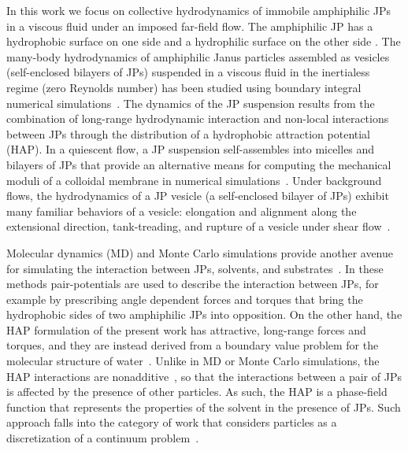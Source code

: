 \documentclass[prb,preprint,showpacs,preprintnumbers,amsmath,amssymb,longbibliography]{revtex4-2}
\begin{document}
In this work we focus on collective hydrodynamics of immobile
amphiphilic JPs in a viscous fluid under an imposed far-field flow. The
amphiphilic JP has a hydrophobic surface on one side and a hydrophilic
surface on the other side \cite{doi:10.1021/la503455h}. The many-body
hydrodynamics of amphiphilic Janus particles assembled as vesicles
(self-enclosed bilayers of JPs) suspended in a viscous fluid in the
inertialess regime (zero Reynolds number) has been studied using
boundary integral numerical simulations~\cite{Fu20,Fu2022_JFM}. The
dynamics of the JP suspension results from the combination of long-range
hydrodynamic interaction and non-local interactions between JPs through
the distribution of a hydrophobic attraction potential (HAP).
%
In a quiescent flow, a JP suspension self-assembles into micelles and
bilayers of JPs that provide an alternative means for computing the
mechanical moduli of a colloidal membrane in numerical
simulations~\cite{NaTr00, Fu20, KrFiGuKaHa13}. Under background flows,
the hydrodynamics of a JP vesicle (a self-enclosed bilayer of JPs)
exhibit many familiar behaviors of a vesicle: elongation and alignment
along the extensional direction, tank-treading, and rupture of a vesicle
under shear flow~\cite{Fu2022_JFM, grandmaison_brancherie_salsac_2021,
D2SM00179A,keller_skalak_1982, Finken08, Shaqfeh11}.

Molecular dynamics (MD) and Monte Carlo simulations provide another
avenue for simulating the interaction between JPs, solvents, and
substrates~\cite{Brandner2019, Baniketal2021,
HongCacciutoLuijtenGranick2008, C9NR05885K}. In these methods
pair-potentials are used to describe the interaction between JPs, for
example by prescribing angle dependent forces and torques that bring the
hydrophobic sides of two amphiphilic JPs into opposition. On the other
hand, the HAP formulation of the present work has attractive, long-range
forces and torques, and they are instead derived from a boundary value
problem for the molecular structure of water~\cite{Ma77, GoHaKo94,
ErLjCl89, Lietal05, Israelachvili80}. Unlike in MD or Monte Carlo
simulations, the HAP interactions are nonadditive~\cite{Fu20}, so that
the interactions between a pair of JPs is affected by the presence of
other particles. As such, the HAP is a phase-field function that
represents the properties of the solvent in the presence of JPs. Such
approach falls into the category of work that considers particles as a
discretization of a continuum problem~\cite{HongWang2021_arXiv}.

\end{document}
